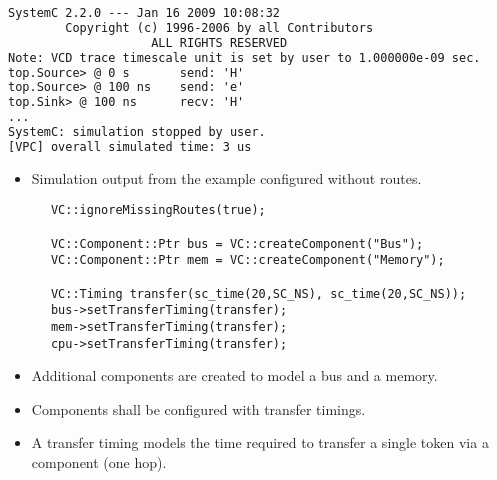 \begin{frame}[fragile=singleslide]
\begin{lstlisting}[language=xml]
             SystemC 2.2.0 --- Jan 16 2009 10:08:32
        Copyright (c) 1996-2006 by all Contributors
                    ALL RIGHTS RESERVED            
Note: VCD trace timescale unit is set by user to 1.000000e-09 sec.
top.Source> @ 0 s       send: 'H'                                 
top.Source> @ 100 ns    send: 'e'                                 
top.Sink> @ 100 ns      recv: 'H'                                 
...
SystemC: simulation stopped by user.                              
[VPC] overall simulated time: 3 us                                
\end{lstlisting}
\begin{itemize}
\item Simulation output from the example configured without routes.
\end{itemize}
\end{frame}


\begin{frame}[fragile=singleslide]
\begin{lstlisting}
      VC::ignoreMissingRoutes(true);

      VC::Component::Ptr bus = VC::createComponent("Bus");
      VC::Component::Ptr mem = VC::createComponent("Memory");

      VC::Timing transfer(sc_time(20,SC_NS), sc_time(20,SC_NS));
      bus->setTransferTiming(transfer);
      mem->setTransferTiming(transfer);
      cpu->setTransferTiming(transfer);
\end{lstlisting}
\begin{itemize}
\item Additional components are created to model a bus and a memory.
\item Components shall be configured with transfer timings.
\item A transfer timing models the time required to transfer a single token via a component (one hop).
\end{itemize}
\end{frame}


